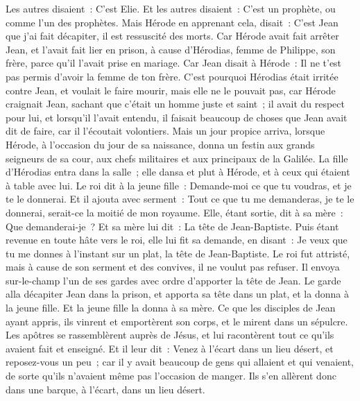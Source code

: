 \begin{multicols}{2}
Les autres disaient~: C'est Elie. Et les autres disaient~: C'est un prophète, ou comme l'un des prophètes.
Mais Hérode en apprenant cela, disait~: C'est Jean que j'ai fait décapiter, il est ressuscité des morts.
Car Hérode avait fait arrêter Jean, et l'avait fait lier en prison, à cause d'Hérodias, femme de Philippe, son frère, parce qu'il l'avait prise en mariage.
Car Jean disait à Hérode~: Il ne t'est pas permis d'avoir la femme de ton frère.
C'est pourquoi Hérodias était irritée contre Jean, et voulait le faire mourir,
mais elle ne le pouvait pas, car Hérode craignait Jean, sachant que c'était un homme juste et saint~; il avait du respect pour lui, et lorsqu'il l'avait entendu, il faisait beaucoup de choses que Jean avait dit de faire, car il l'écoutait volontiers.
 Mais un jour propice arriva, lorsque Hérode, à l'occasion du jour de sa naissance, donna un festin aux grands seigneurs de sa cour, aux chefs militaires et aux principaux de la Galilée.
La fille d'Hérodias entra dans la salle~; elle dansa et plut à Hérode, et à ceux qui étaient à table avec lui. Le roi dit à la jeune fille~: Demande-moi ce que tu voudras, et je te le donnerai.
Et il ajouta avec serment~: Tout ce que tu me demanderas, je te le donnerai, serait-ce la moitié de mon royaume.
Elle, étant sortie, dit à sa mère~: Que demanderai-je~? Et sa mère lui dit~: La tête de Jean-Baptiste.
Puis étant revenue en toute hâte vers le roi, elle lui fit sa demande, en disant~: Je veux que tu me donnes à l'instant sur un plat, la tête de Jean-Baptiste.
Le roi fut attristé, mais à cause de son serment et des convives, il ne voulut pas refuser.
Il envoya sur-le-champ l'un de ses gardes avec ordre d'apporter la tête de Jean.
Le garde alla décapiter Jean dans la prison, et apporta sa tête dans un plat, et la donna à la jeune fille. Et la jeune fille la donna à sa mère.
Ce que les disciples de Jean ayant appris, ils vinrent et emportèrent son corps, et le mirent dans un sépulcre.
Les apôtres se rassemblèrent auprès de Jésus, et lui racontèrent tout ce qu'ils avaient fait et enseigné.
Et il leur dit~: Venez à l'écart dans un lieu désert, et reposez-vous un peu~; car il y avait beaucoup de gens qui allaient et qui venaient, de sorte qu'ils n'avaient même pas l'occasion de manger.
Ils s'en allèrent donc dans une barque, à l'écart, dans un lieu désert.

\end{multicols}

